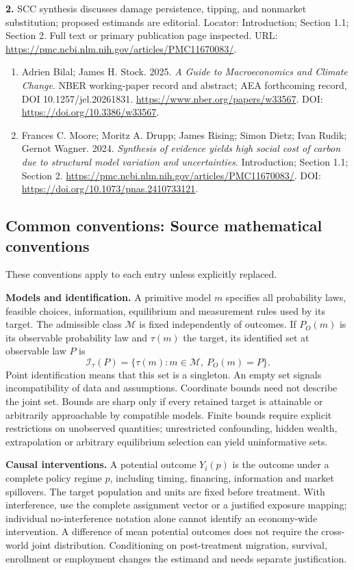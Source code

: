 \documentclass[11pt,a4paper]{article}
\begin{document}
\textbf{2.} SCC synthesis discusses damage persistence, tipping, and nonmarket substitution; proposed estimands are editorial. Locator: Introduction; Section 1.1; Section 2. Full text or primary publication page inspected. URL: \url{https://pmc.ncbi.nlm.nih.gov/articles/PMC11670083/}.
\begin{enumerate}\raggedright
\item\hypertarget{definitions:source:30007713:1}{} Adrien Bilal; James H. Stock. 2025. \emph{A Guide to Macroeconomics and Climate Change}. NBER working-paper record and abstract; AEA forthcoming record, DOI 10.1257/jel.20261831.
\url{https://www.nber.org/papers/w33567}.
DOI: \url{https://doi.org/10.3386/w33567}.
\item\hypertarget{definitions:source:30007713:2}{} Frances C. Moore; Moritz A. Drupp; James Rising; Simon Dietz; Ivan Rudik; Gernot Wagner. 2024. \emph{Synthesis of evidence yields high social cost of carbon due to structural model variation and uncertainties}. Introduction; Section 1.1; Section 2.
\url{https://pmc.ncbi.nlm.nih.gov/articles/PMC11670083/}.
DOI: \url{https://doi.org/10.1073/pnas.2410733121}.
\end{enumerate}

\subsection*{Common conventions: Source mathematical conventions}

These conventions apply to each entry unless explicitly replaced.

\textbf{Models and identification.} A primitive model \(m\) specifies all probability laws, feasible choices, information, equilibrium and measurement rules used by its target. The admissible class \(\mathcal M\) is fixed independently of outcomes. If \(P_O(m)\) is its observable probability law and \(\tau(m)\) the target, its identified set at observable law \(P\) is
\[
 \mathcal I_\tau(P)=\{\tau(m):m\in\mathcal M,\ P_O(m)=P\}.
\]
Point identification means that this set is a singleton. An empty set signals incompatibility of data and assumptions. Coordinate bounds need not describe the joint set. Bounds are sharp only if every retained target is attainable or arbitrarily approachable by compatible models. Finite bounds require explicit restrictions on unobserved quantities; unrestricted confounding, hidden wealth, extrapolation or arbitrary equilibrium selection can yield uninformative sets.

\textbf{Causal interventions.} A potential outcome \(Y_i(p)\) is the outcome under a complete policy regime \(p\), including timing, financing, information and market spillovers. The target population and units are fixed before treatment. With interference, use the complete assignment vector or a justified exposure mapping; individual no-interference notation alone cannot identify an economy-wide intervention. A difference of mean potential outcomes does not require the cross-world joint distribution. Conditioning on post-treatment migration, survival, enrollment or employment changes the estimand and needs separate justification.
\end{document}

